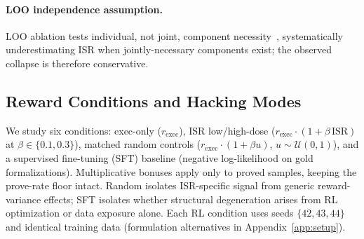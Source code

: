 \paragraph{LOO independence assumption.}
LOO ablation tests individual, not joint, component necessity~\citep{jia-harman-survey}, systematically underestimating ISR when jointly-necessary components exist; the observed collapse is therefore conservative.

\subsection{Reward Conditions and Hacking Modes}
\label{sec:rewards}
\label{sec:taxonomy-method}

We study six conditions: exec-only ($r_{\text{exec}}$), ISR low/high-dose ($r_{\text{exec}}\cdot(1{+}\beta\,\text{ISR})$ at $\beta\in\{0.1,0.3\}$), matched random controls ($r_{\text{exec}}\cdot(1{+}\beta u)$, $u\sim\mathcal{U}(0,1)$), and a supervised fine-tuning (SFT) baseline (negative log-likelihood on gold formalizations).
Multiplicative bonuses apply only to proved samples, keeping the prove-rate floor intact.
Random isolates ISR-specific signal from generic reward-variance effects; SFT isolates whether structural degeneration arises from RL optimization or data exposure alone.
Each RL condition uses seeds $\{42,43,44\}$ and identical training data (formulation alternatives in Appendix~\ref{app:setup}).

